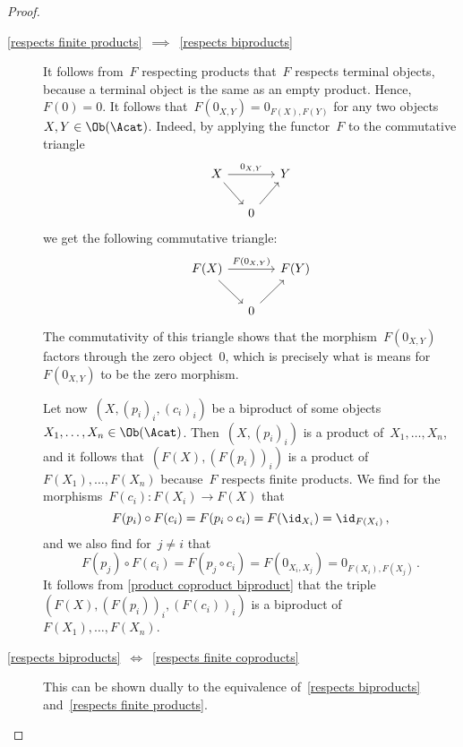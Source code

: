 \begin{proof}
\begin{enumerate}
\begin{description}
        \item[\ref*{respects finite products}~$\implies$~\ref*{respects biproducts}]
          It follows from~$F$ respecting products that~$F$ respects terminal objects, because a terminal object is the same as an empty product.
          Hence,~$F(0) = 0$.
          It follows that~$F(0_{X,Y}) = 0_{F(X), F(Y)}$ for any two objects~$X, Y \in \Ob(\Acat)$.
          Indeed, by applying the functor~$F$ to the commutative triangle
          \[
            \begin{tikzcd}[column sep = small]
                X
                \arrow{rr}[above]{0_{X,Y}}
                \arrow{dr}
              & {}
              & Y
              \\
                {}
              & 0
                \arrow{ur}
              & {}
            \end{tikzcd}
          \]
          we get the following commutative triangle:
          \[
            \begin{tikzcd}[column sep = small]
                F(X)
                \arrow{rr}[above]{F(0_{X,Y})}
                \arrow{dr}
              & {}
              & F(Y)
              \\
                {}
              & 0
                \arrow{ur}
              & {}
            \end{tikzcd}
          \]
          The commutativity of this triangle shows that the morphism~$F(0_{X,Y})$ factors through the zero object~$0$, which is precisely what is means for~$F(0_{X,Y})$ to be the zero morphism.
          
          Let now~$(X, (p_i)_i, (c_i)_i)$ be a biproduct of some objects~$X_1, \dotsc, X_n \in \Ob(\Acat)$.
          Then~$(X, (p_i)_i)$ is a product of~$X_1, \dotsc, X_n$, and it follows that~$(F(X), (F(p_i))_i)$ is a product of~$F(X_1), \dotsc, F(X_n)$ because~$F$ respects finite products.
          We find for the morphisms~$F(c_i) \colon F(X_i) \to F(X)$ that
          \[
              F(p_i) \circ F(c_i)
            = F(p_i \circ c_i)
            = F( \id_{X_i} )
            = \id_{F(X_i)} \,,
          \]
          and we also find for~$j \neq i$ that
          \[
              F(p_j) \circ F(c_i)
            = F(p_j \circ c_i)
            = F(0_{X_i, X_j})
            = 0_{F(X_i), F(X_j)} \,.
          \]
          It follows from \cref{product coproduct biproduct} that the triple~$(F(X), (F(p_i))_i, (F(c_i))_i)$ is a biproduct of~$F(X_1), \dotsc, F(X_n)$.
          
        \item[\ref*{respects biproducts}~$\iff$~\ref*{respects finite coproducts}]
          This can be shown dually to the equivalence of~\ref*{respects biproducts} and~\ref*{respects finite products}.
        

\end{description}
\end{enumerate}
\end{proof}
